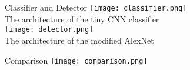 \begin{frame}{Classifier and Detector}
  \small
\centering
  \texttt{[image: classifier.png]}  \\
  The architecture of the tiny CNN classifier\\
  \vspace{1cm}
  \texttt{[image: detector.png]}  \\
  The architecture of the modified AlexNet
\end{frame}

\begin{frame}{Comparison}
  \centering
    \texttt{[image: comparison.png]}
\end{frame}
